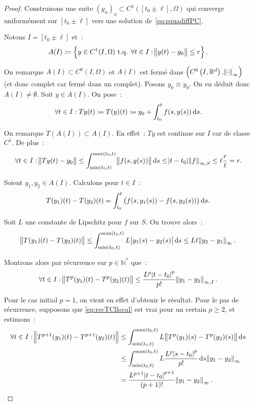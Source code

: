 \documentclass{report}
\theoremstyle{definition}
\theoremstyle{remark}
\numberwithin{equation}{section}
\newcommand{\R}{\mathbb R}
\newcommand{\N}{\mathbb N}
\newcommand{\Ns}{\N^{*}}
\newcommand{\tq}{\text{ t.q. }}
\newcommand{\evfn}[3]{\left(#1\left(#2, #3\right), \norm {\cdot}_{\infty}\right)}
\newcommand{\evnC}[3]{{\evfn {C^{#1}}{#2}{#3}}}
\begin{document}
			\begin{proof} Construisons une suite $(y_n)_n \subset C^1([t_0 \pm \ell], \Omega)$ qui converge uniformément sur $[t_0 \pm \ell]$ vers une solution
			de~\eqref{eq:equadiffPC}.

			Notons $I = [t_0 \pm \ell]$ et~:
			\begin{equation}
				A(I) \coloneqq \left\{y \in C^1(I, \Omega) \tq \forall t \in I : \norm {y(t) - y_0} \leq r\right\}.
			\end{equation}

			On remarque $A(I) \subset C^0(I, \Omega)$ et $A(I)$ est fermé dans $\evnC0I{\R^d}$ (et donc complet car fermé dans un complet). Posons
			$y_0 \equiv y_0$\footnotemark. On en déduit donc
			$A(I) \neq \emptyset$. Soit $y \in A(I)$. On pose~:
			\begin{equation}
				\forall t \in I : Ty(t) \coloneqq T(y)(t) \coloneqq y_0 + \int_{t_0}^tf(s, y(s))\dif s.
			\end{equation}

			On remarque $T(A(I)) \subset A(I)$. En effet~: $Ty$ est continue sur $I$ car de classe $C^1$. De plus~:
			\begin{equation}
				\forall t \in I : \norm {Ty(t) - y_0} \leq \int_{\min(t_0, t)}^{\max(t_0, t)}\norm {f(s, y(s))}\dif s \leq \abs {t-t_0}\norm f_{\infty, S}
				\leq \ell\frac r\ell = r.
			\end{equation}

			Soient $y_1, y_2 \in A(I)$. Calculons pour $t \in I$~:
			\begin{equation}
				T(y_1)(t) - T(y_2)(t) = \int_{t_0}^t\left(f(s, y_1(s)) - f(s, y_2(s))\right)\dif s.
			\end{equation}

			Soit $L$ une constante de Lipschitz pour $f$ sur $S$. On trouve alors~:
			\begin{equation}
				\norm {T(y_1)(t) - T(y_2)(t)} \leq \int_{\min(t_0, t)}^{\max(t_0, t)}L\abs {y_1(s)-y_2(s)}\dif s \leq L\ell\norm {y_2-y_1}_\infty.
			\end{equation}

			Montrons alors par récurrence sur $p \in \Ns$ que~:
			\begin{align}\label{eq:recTCllocal}
				\forall t \in I : \norm {T^p(y_1)(t) - T^p(y_2)(t)} \leq \frac {L^p\abs {t-t_0}^p}{p!}\norm {y_1-y_2}_{\infty, I}.
			\end{align}

			Pour le cas initial $p=1$, on vient en effet d'obtenir le résultat. Pour le pas de récurrence, supposons que \eqref{eq:recTCllocal} est vrai pour un
			certain $p \geq 2$, et estimons~:
			\begin{align}
				\forall t \in I : \norm {T^{p+1}(y_1)(t) - T^{p+1}(y_2)(t)} &\leq \int_{\min(t_0, t)}^{\max(t_0, t)}L\norm {T^p(y_1)(s) - T^p(y_2)(s)}\dif s \\
				&\leq \int_{\min(t_0, t)}^{\max(t_0, t)}L\frac {L^p\abs {s-t_0}^p}{p!}\dif s\norm {y_1-y_2}_\infty \\
				&= \frac {L^{p+1}\abs {t-t_0}^{p+1}}{(p+1)!}\norm {y_1-y_2}_\infty.
			\end{align}


\end{proof}
\end{document}
